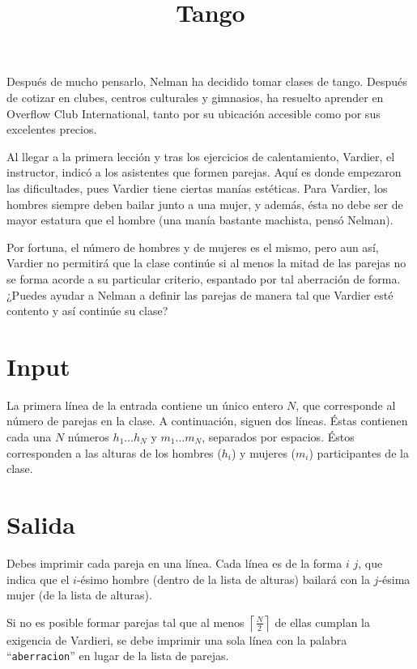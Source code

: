\documentclass{article}
\title{Tango}
\begin{document}
\maketitle

Después de mucho pensarlo, Nelman ha decidido tomar clases de tango. Después de
cotizar en clubes, centros culturales y gimnasios, ha resuelto aprender en
Overflow Club International, tanto por su ubicación accesible como por sus
excelentes precios.

Al llegar a la primera lección y tras los ejercicios de calentamiento, Vardier,
el instructor, indicó a los asistentes que formen parejas. Aquí es donde 
empezaron las dificultades, pues Vardier tiene ciertas manías estéticas. Para
Vardier, los hombres siempre deben bailar junto a una mujer, y además, ésta no
debe ser de mayor estatura que el hombre (una manía bastante machista, pensó
Nelman).

Por fortuna, el número de hombres y de mujeres es el mismo, pero aun así,
Vardier no permitirá que la clase continúe si al menos la mitad de las parejas
no se forma acorde a su particular criterio, espantado por tal aberración de
forma. ¿Puedes ayudar a Nelman a definir las parejas de manera tal que Vardier
esté contento y así continúe su clase?

\section*{Input}
La primera línea de la entrada contiene un único entero $N$, que corresponde al
número de parejas en la clase. A continuación, siguen dos líneas. Éstas
contienen cada una $N$ números $h_1 \dots h_N$ y $m_1 \dots m_N$, separados por
espacios. Éstos corresponden a las alturas de los hombres ($h_i$) y mujeres
($m_i$) participantes de la clase.

\section*{Salida}
Debes imprimir cada pareja en una línea. Cada línea es de la forma $i$ $j$, que
indica que el $i$-ésimo hombre (dentro de la lista de alturas) bailará con la
$j$-ésima mujer (de la lista de alturas).

Si no es posible formar parejas tal que al menos
$\left\lceil\frac{N}{2}\right\rceil$ de ellas cumplan la exigencia de Vardieri,
se debe imprimir una sola línea con la palabra ``\verb+aberracion+'' en lugar
de la lista de parejas.
\end{document}
